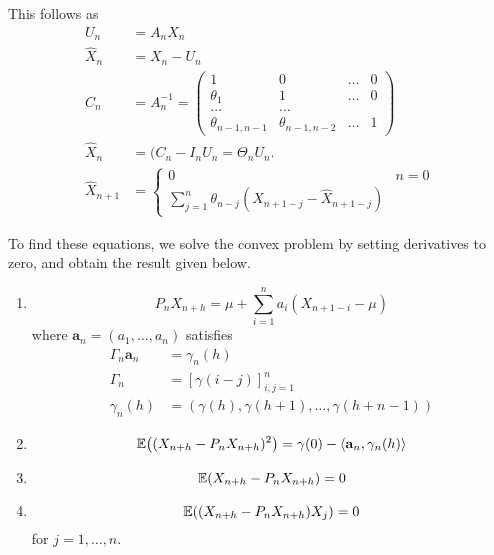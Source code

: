 This follows as
\begin{align}
  \label{eq:78}
  U_{n} &= A_{n} X_{n} \\
  \hat X_{n} &= X_{n} - U_{n} \\
  C_{n} &= A_{n}^{-1} =
  \begin{pmatrix}
    1 &0 &\dots &0 \\
    \theta_{1} &1 &\dots &0 \\
    \dots &\dots & & \\
    \theta_{n-1, n-1} &\theta_{n-1, n-2} &\dots &1
  \end{pmatrix} \\
  \hat X_{n} &= (C_{n} - I_{n} U_{n} = \Theta_{n} U_{n}. \\
  \hat X_{n+1} &=
  \begin{cases}
    0 & n = 0 \\
    \sum_{j=1}^{n} \theta_{n-j} (X_{n+1-j} - \hat X_{n+1-j}) 
  \end{cases}
\end{align}

To find these equations, we solve the convex problem by setting
derivatives to zero, and obtain the result given below.

\begin{thm}
  \label{defn:stationary_processes:1}
  \begin{enumerate}
  \item
    \begin{equation}
      P_{n}X_{n+h} = \mu + \sum_{i=1}^{n} a_{i} (X_{n+1-i} - \mu)
    \end{equation} where $\mathbf{a}_{n} = (a_{1}, \dots, a_{n})$ satisfies
    \begin{align}
      \Gamma_{n} \mathbf{a}_{n} &= \gamma_{n}(h) \\
      \Gamma_{n} &= [\gamma(i - j)]^{n}_{i,j = 1} \\
      \gamma_{n}(h) &= (\gamma(h), \gamma(h+1), \dots, \gamma(h + n - 1))
    \end{align}
  \item
    \begin{equation}
      \E{(X_{n+h} - P_{n} X_{n+h})^{2}} = \gamma(0) -
      \IP{\mathbf{a}_{n}, \gamma_{n}(h)}
    \end{equation}
  \item
    \begin{equation}
      \E{X_{n+h} - P_{n} X_{n+h}} = 0
    \end{equation}
  \item
    \begin{equation}
      \E{(X_{n+h} - P_{n} X_{n+h}) X_{j}} = 0
    \end{equation} for $j = 1, \dots, n$.
  \end{enumerate}
\end{thm}


